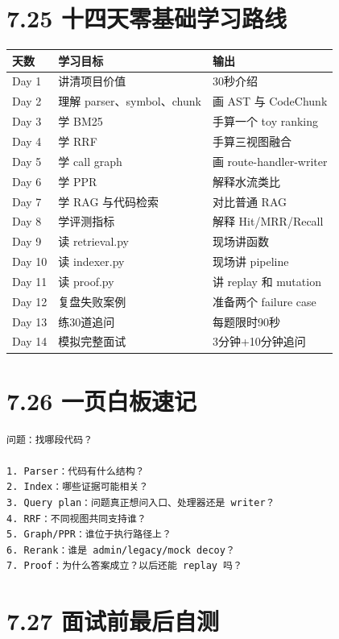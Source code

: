 \documentclass[UTF8,12pt,openany]{ctexbook}
\begin{document}
\section{7.25 十四天零基础学习路线}

\begin{center}
\small
\begin{longtable}{|p{}|p{}|p{}|}
\toprule
天数 & 学习目标 & 输出 \\
\midrule
Day 1 & 讲清项目价值 & 30秒介绍 \\
Day 2 & 理解 parser、symbol、chunk & 画 AST 与 CodeChunk \\
Day 3 & 学 BM25 & 手算一个 toy ranking \\
Day 4 & 学 RRF & 手算三视图融合 \\
Day 5 & 学 call graph & 画 route-handler-writer \\
Day 6 & 学 PPR & 解释水流类比 \\
Day 7 & 学 RAG 与代码检索 & 对比普通 RAG \\
Day 8 & 学评测指标 & 解释 Hit/MRR/Recall \\
Day 9 & 读 retrieval.py & 现场讲函数 \\
Day 10 & 读 indexer.py & 现场讲 pipeline \\
Day 11 & 读 proof.py & 讲 replay 和 mutation \\
Day 12 & 复盘失败案例 & 准备两个 failure case \\
Day 13 & 练30道追问 & 每题限时90秒 \\
Day 14 & 模拟完整面试 & 3分钟+10分钟追问 \\
\bottomrule
\end{longtable}
\end{center}

\section{7.26 一页白板速记}

\begin{lstlisting}
问题：找哪段代码？

1. Parser：代码有什么结构？
2. Index：哪些证据可能相关？
3. Query plan：问题真正想问入口、处理器还是 writer？
4. RRF：不同视图共同支持谁？
5. Graph/PPR：谁位于执行路径上？
6. Rerank：谁是 admin/legacy/mock decoy？
7. Proof：为什么答案成立？以后还能 replay 吗？
\end{lstlisting}

\section{7.27 面试前最后自测}
\end{document}
